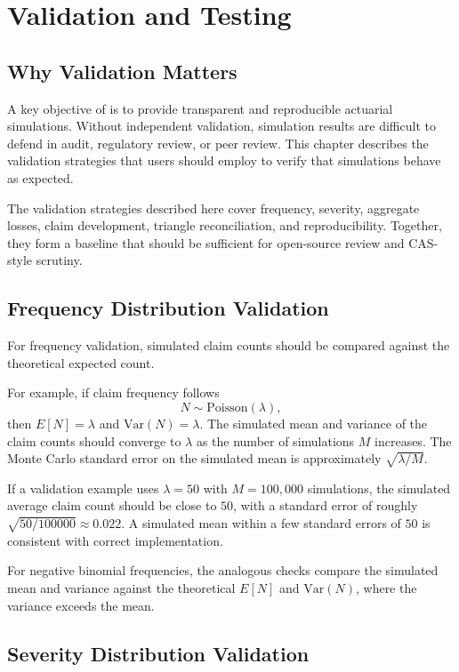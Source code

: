 \chapter{Validation and Testing}
\label{chap:validation}

\section{Why Validation Matters}

A key objective of \actsim is to provide transparent and reproducible
actuarial simulations. Without independent validation, simulation
results are difficult to defend in audit, regulatory review, or
peer review. This chapter describes the validation strategies that
\actsim users should employ to verify that simulations behave as
expected.

The validation strategies described here cover frequency, severity,
aggregate losses, claim development, triangle reconciliation, and
reproducibility. Together, they form a baseline that should be
sufficient for open-source review and CAS-style scrutiny.

\section{Frequency Distribution Validation}

For frequency validation, simulated claim counts should be compared
against the theoretical expected count.

For example, if claim frequency follows
\[
    N \sim \mathrm{Poisson}(\lambda),
\]
then $E[N] = \lambda$ and $\mathrm{Var}(N) = \lambda$. The simulated
mean and variance of the claim counts should converge to $\lambda$ as
the number of simulations $M$ increases. The Monte Carlo standard error
on the simulated mean is approximately $\sqrt{\lambda / M}$.

If a validation example uses $\lambda = 50$ with $M = 100{,}000$
simulations, the simulated average claim count should be close to $50$,
with a standard error of roughly $\sqrt{50/100000} \approx 0.022$. A
simulated mean within a few standard errors of $50$ is consistent with
correct implementation.

For negative binomial frequencies, the analogous checks compare the
simulated mean and variance against the theoretical $E[N]$ and
$\mathrm{Var}(N)$, where the variance exceeds the mean.

\section{Severity Distribution Validation}

